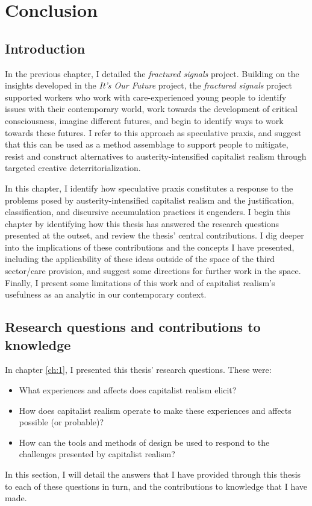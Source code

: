 \chapter{Conclusion}
\label{ch:9}

\section{Introduction}
\label{sec:}
In the previous chapter, I detailed the \textit{fractured signals} project. Building on the insights developed in the \emph{It's Our Future} project, the \emph{fractured signals} project supported workers who work with care-experienced young people to identify issues with their contemporary world, work towards the development of critical consciousness, imagine different futures, and begin to identify ways to work towards these futures. I refer to this approach as speculative praxis, and suggest that this can be used as a method assemblage to support people to mitigate, resist and construct alternatives to austerity-intensified capitalist realism through targeted creative deterritorialization. 

In this chapter, I identify how speculative praxis constitutes a response to the problems posed by austerity-intensified capitalist realism and the justification, classification, and discursive accumulation practices it engenders. I begin this chapter by identifying how this thesis has answered the research questions presented at the outset, and review the thesis' central contributions. I dig deeper into the implications of these contributions and the concepts I have presented, including the applicability of these ideas outside of the space of the third sector/care provision, and suggest some directions for further work in the space. Finally, I present some limitations of this work and of capitalist realism's usefulness as an analytic in our contemporary context.

\section{Research questions and contributions to knowledge}
In chapter \ref{ch:1}, I presented this thesis' research questions. These were:
\begin{itemize}
    \item What experiences and affects does capitalist realism elicit?
    \item How does capitalist realism operate to make these experiences and affects possible (or probable)?
    \item How can the tools and methods of design be used to respond to the challenges presented by capitalist realism?
\end{itemize}
In this section, I will detail the answers that I have provided through this thesis to each of these questions in turn, and the contributions to knowledge that I have made.

